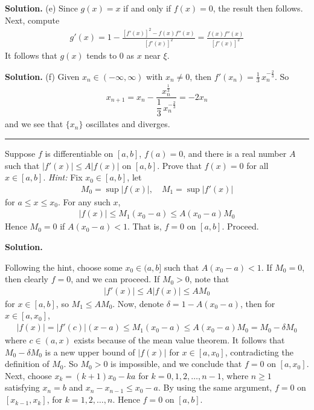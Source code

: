 \documentclass[12pt]{article}
\theoremstyle{definition}
\begin{document}
\smallskip
\noindent\textbf{Solution.}\quad
(e) Since $g(x)=x$ if and only if $f(x)=0$, the result then follows. Next, compute
\begin{align*}
g'(x)=1-\frac{\left[f'(x)\right]^2-f(x)f''(x)}{\left[f'(x)\right]^2}=\frac{f(x)f''(x)}{\left[f'(x)\right]^2}
\end{align*}
It follows that $g(x)$ tends to $0$ as $x$ near $\xi$.

\smallskip
\noindent\textbf{Solution.}\quad
(f) Given $x_n\in(-\infty,\infty)$ with $x_n\ne 0$, then $f'(x_n)=\frac{1}{3}\,x_n^{-\frac{2}{3}}$. So
\begin{align*}
x_{n+1}
=x_n-\dfrac{x_n^{\frac{1}{3}}}{\dfrac{1}{3}\,x_n^{-\frac{2}{3}}}
=-2x_n
\end{align*}
and we see that $\{x_n\}$ oscillates and diverges.



\bigskip\noindent\hrule\bigskip

Suppose $f$ is differentiable on $[a,b]$, $f(a)=0$, and there is a real number $A$ such that $\left\vert f'(x)\right\vert\le A\left\vert f(x)\right\vert$ on $[a,b]$. Prove that $f(x)=0$ for all $x\in[a,b]$. \textit{Hint:} Fix $x_0\in[a,b]$, let
\begin{align*}
M_0=\sup\left\vert f(x)\right\vert,\quad M_1=\sup\left\vert f'(x)\right\vert
\end{align*}
for $a\le x\le x_0$. For any such $x$,
\begin{align*}
\left\vert f(x)\right\vert\le M_1(x_0-a)\le A(x_0-a)M_0
\end{align*}
Hence $M_0=0$ if $A(x_0-a)<1$. That is, $f=0$ on $[a,b]$. Proceed.

\smallskip
\noindent\textbf{Solution.}\quad

Following the hint, choose some $x_0\in(a,b]$ such that $A(x_0-a)<1$. If $M_0=0$, then clearly $f=0$, and we can proceed. If $M_0>0$, note that
\begin{align*}
\left\vert f'(x)\right\vert
\le A\left\vert f(x)\right\vert
\le AM_0
\end{align*}
for $x\in[a,b]$, so $M_1\le AM_0$. Now, denote $\delta=1-A(x_0-a)$, then for $x\in[a,x_0]$,
\begin{align*}
\left\vert f(x)\right\vert
=\left\vert f'(c)\right\vert(x-a)
\le M_1(x_0-a)
\le A(x_0-a)M_0
=M_0-\delta M_0
\end{align*}
where $c\in(a,x)$ exists because of the mean value theorem. It follows that $M_0-\delta M_0$ is a new upper bound of $
\left\vert f(x)\right\vert$ for $x\in[a,x_0]$, contradicting the definition of $M_0$. So $M_0>0$ is impossible, and we conclude that $f=0$ on $[a,x_0]$. Next, choose $x_k=(k+1)x_0-ka$ for $k=0,1,2,\ldots,n-1$, where $n\ge 1$ satisfying $x_n=b$ and $x_n-x_{n-1}\le x_0-a$. By using the same argument, $f=0$ on $[x_{k-1},x_k]$, for $k=1,2,\ldots,n$. Hence $f=0$ on $[a,b]$.
\end{document}
